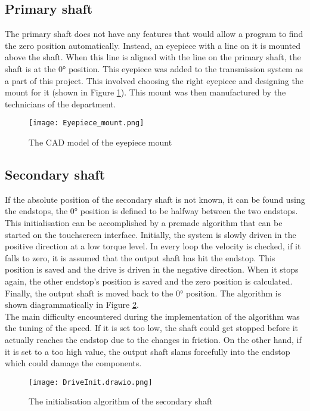\documentclass[12pt]{article}
\begin{document}
\subsection{Primary shaft}
The primary shaft does not have any features that would allow a program to find the zero position automatically. Instead, an eyepiece with a line on it is mounted above the shaft. When this line is aligned with the line on the primary shaft, the shaft is at the 0° position. This eyepiece was added to the transmission system as a part of this project. This involved choosing the right eyepiece and designing the mount for it (shown in Figure \ref{fig:eyepieceMount}). This mount was then manufactured by the technicians of the department. 

\begin{figure}[h]
    \centering
    \texttt{[image: Eyepiece\_mount.png]}
    \caption{The CAD model of the eyepiece mount}
    \label{fig:eyepieceMount}
\end{figure}



\subsection{Secondary shaft}
If the absolute position of the secondary shaft is not known, it can be found using the endstops, the 0° position is defined to be halfway between the two endstops. This initialisation can be accomplished by a premade algorithm that can be started on the touchscreen interface. Initially, the system is slowly driven in the positive direction at a low torque level. In every loop the velocity is checked, if it falls to zero, it is assumed that the output shaft has hit the endstop. This position is saved and the drive is driven in the negative direction. When it stops again, the other endstop's position is saved and the zero position is calculated. Finally, the output shaft is moved back to the 0° position. The algorithm is shown diagrammatically in Figure \ref{fig:driveInit}.\\

The main difficulty encountered during the implementation of the algorithm was the tuning of the speed. If it is set too low, the shaft could get stopped before it actually reaches the endstop due to the changes in friction. On the other hand, if it is set to a too high value, the output shaft slams forcefully into the endstop which could damage the components. 


\begin{figure}
    \centering
    \texttt{[image: DriveInit.drawio.png]}
    \caption{The initialisation algorithm of the secondary shaft}
    \label{fig:driveInit}
\end{figure}
\end{document}
